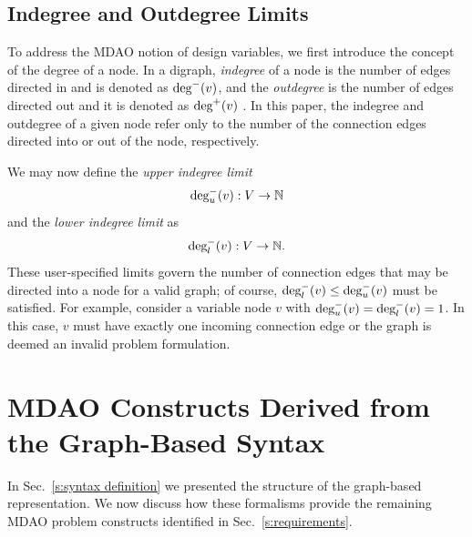 \subsection{Indegree and Outdegree Limits}
  \label{s:indegree-outdegree}
	To address the MDAO notion of design variables, we first introduce the concept of the degree of a node.
  In a digraph, \emph{indegree} of a node is the number of edges directed in and 
  is denoted as $\textrm{deg}^-(v)$, and the \emph{outdegree} 
  is the number of edges directed out and it is denoted as $\textrm{deg}^+(v)$ \cite{Diestel2010}.
  In this paper, the indegree and outdegree of a given node refer only to the number of the connection edges 
  directed into or out of the node, respectively. 

  We may now define the \emph{upper indegree limit} 
  \begin{equation}
  \textrm{deg}_u^-(v):V \to \mathbb{N}
  \end{equation} 
  and the \emph{lower indegree limit} as
  \begin{equation}
  \textrm{deg}_l^-(v):V \to \mathbb{N}.
  \end{equation}
  These user-specified limits govern the number of connection edges that may 
  be directed into a node for a valid graph; of course, $\textrm{deg}_l^-(v) \leq \textrm{deg}_u^-(v)$ must be satisfied. 
For example, consider a variable 
  node $v$ with $\textrm{deg}_u^-(v) = \textrm{deg}_l^-(v) = 1$. In this case, $v$ 
  must have exactly one incoming connection edge or the graph is deemed an invalid problem formulation. 

\section{MDAO Constructs Derived from the Graph-Based Syntax}
\label{s:graph representation}
In Sec.~\ref{s:syntax definition} we presented the structure of the graph-based representation. We now discuss how these formalisms provide the remaining MDAO problem constructs identified in Sec.~\ref{s:requirements}.


